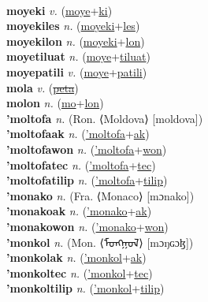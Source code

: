  \label{moyecai} \\
\textbf{moyeki} \textit{v.} (\hyperref[moye]{moye}+\hyperref[ki]{ki})
 \label{moyeki} \\
\textbf{moyekiles} \textit{n.} (\hyperref[moyeki]{moyeki}+\hyperref[les]{les})
 \label{moyekiles} \\
\textbf{moyekilon} \textit{n.} (\hyperref[moyeki]{moyeki}+\hyperref[lon]{lon})
 \label{moyekilon} \\
\textbf{moyetiluat} \textit{n.} (\hyperref[moye]{moye}+\hyperref[tiluat]{tiluat})
 \label{moyetiluat} \\
\textbf{moyepatili} \textit{v.} (\hyperref[moye]{moye}+\hyperref[patili]{patili})
 \label{moyepatili} \\
\textbf{mola} \textit{v.} (\hyperref[peta]{\sout{peta}})
 \label{mola} \\
\textbf{molon} \textit{n.} (\hyperref[mo]{mo}+\hyperref[lon]{lon})
 \label{molon} \\
\textbf{'moltofa} \textit{n.} (Ron. ⟨Moldova⟩ [moldova])
 \label{'moltofa} \\
\textbf{'moltofaak} \textit{n.} (\hyperref['moltofa]{'moltofa}+\hyperref[ak]{ak})
 \label{'moltofaak} \\
\textbf{'moltofawon} \textit{n.} (\hyperref['moltofa]{'moltofa}+\hyperref[won]{won})
 \label{'moltofawon} \\
\textbf{'moltofatec} \textit{n.} (\hyperref['moltofa]{'moltofa}+\hyperref[tec]{tec})
 \label{'moltofatec} \\
\textbf{'moltofatilip} \textit{n.} (\hyperref['moltofa]{'moltofa}+\hyperref[tilip]{tilip})
 \label{'moltofatilip} \\
\textbf{'monako} \textit{n.} (Fra. ⟨Monaco⟩ [mɔnako])
 \label{'monako} \\
\textbf{'monakoak} \textit{n.} (\hyperref['monako]{'monako}+\hyperref[ak]{ak})
 \label{'monakoak} \\
\textbf{'monakowon} \textit{n.} (\hyperref['monako]{'monako}+\hyperref[won]{won})
 \label{'monakowon} \\
\textbf{'monkol} \textit{n.} (Mon. ⟨ᠮᠣᠩᠭᠣᠯ⟩ [mɔŋɢɔɮ])
 \label{'monkol} \\
\textbf{'monkolak} \textit{n.} (\hyperref['monkol]{'monkol}+\hyperref[ak]{ak})
 \label{'monkolak} \\
\textbf{'monkoltec} \textit{n.} (\hyperref['monkol]{'monkol}+\hyperref[tec]{tec})
 \label{'monkoltec} \\
\textbf{'monkoltilip} \textit{n.} (\hyperref['monkol]{'monkol}+\hyperref[tilip]{tilip})

